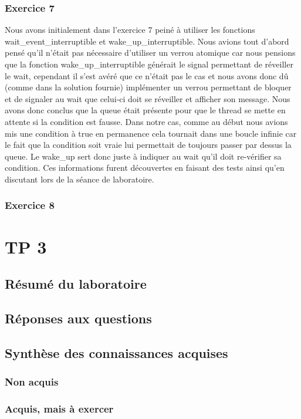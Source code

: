 \documentclass{ReportTemplate}
\begin{document}
\subsection{Exercice 7}
Nous avons initialement dans l'exercice 7 peiné à utiliser les fonctions
wait\_event\_interruptible et wake\_up\_interruptible. Nous avions tout d'abord
pensé qu'il n'était pas nécessaire d'utiliser un verrou atomique car nous
pensions que la fonction wake\_up\_interruptible générait le signal permettant
de réveiller le wait, cependant il s'est avéré que ce n'était pas le cas et nous
avons donc dû (comme dans la solution fournie) implémenter un verrou permettant
de bloquer et de signaler au wait que celui-ci doit se réveiller et afficher son
message. Nous avons donc conclus que la queue était présente pour que le thread
se mette en attente si la condition est fausse. Dans notre cas, comme au début
nous avions mis une condition à true en permanence cela tournait dans une boucle
infinie car le fait que la condition soit vraie lui permettait de toujours
passer par dessus la queue. Le wake\_up sert donc juste à indiquer au wait qu'il
doit re-vérifier sa condition. Ces informations furent découvertes en faisant
des tests ainsi qu'en discutant lors de la séance de laboratoire.\newline
\newpage
\subsection{Exercice 8}

\chapter{TP 3}
\section{Résumé du laboratoire}
\section{Réponses aux questions}
\section{Synthèse des connaissances acquises}
\subsection{Non acquis}

\subsection{Acquis, mais à exercer}
\end{document}
